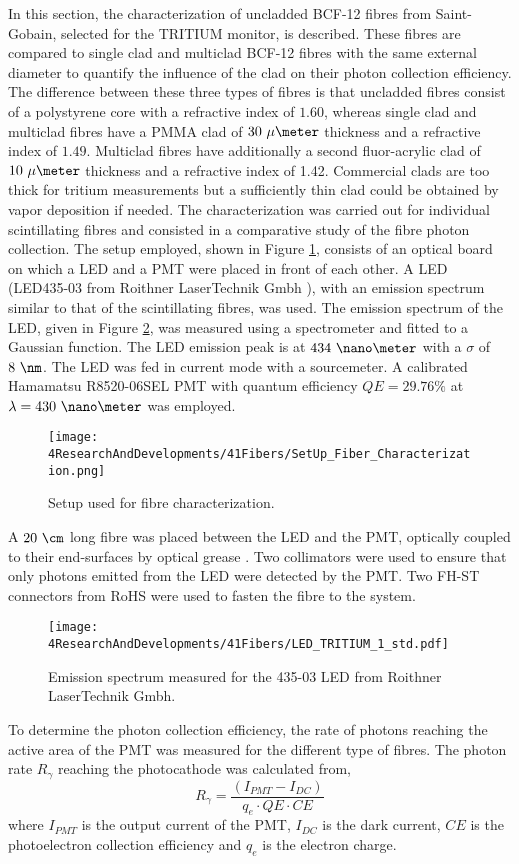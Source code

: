 In this section, the characterization of uncladded BCF-12 fibres from Saint-Gobain, selected for the TRITIUM monitor, is described. These fibres are compared to single clad and multiclad BCF-12 fibres with the same external diameter to quantify the influence of the clad on their photon collection efficiency. The difference between these three types of fibres is that uncladded fibres consist of a polystyrene core with a refractive index of $1.60$, whereas single clad and multiclad fibres have a PMMA clad of $30~\mu\meter$ thickness and a refractive index of $1.49$. Multiclad fibres have additionally a second fluor-acrylic clad of $10~\mu\meter$ thickness and a refractive index of 1.42. Commercial clads are too thick for tritium measurements but a sufficiently thin clad could be obtained by vapor deposition if needed. The characterization was carried out for individual scintillating fibres and consisted in a comparative study of the fibre photon collection. The setup employed, shown in Figure \ref{fig:SetUpFiberCharacterization}, consists of an optical board on which a LED and a PMT were placed in front of each other. A LED (LED435-03 from Roithner LaserTechnik Gmbh \cite{LEDRLT}), with an emission spectrum similar to that of the scintillating fibres, was used. The emission spectrum of the LED, given in Figure \ref{fig:LEDSpectrumTritium}, was measured using a spectrometer and fitted to a Gaussian function. The LED emission peak is at $434~\nano\meter$ with a $\sigma$ of $8~\nm$. The LED was fed in current mode with a sourcemeter. A calibrated Hamamatsu R8520-06SEL PMT with quantum efficiency $QE=29.76\%$ at $\lambda=430~\nano\meter$ was employed. 
\begin{figure}[h]
\centering
\texttt{[image: 4ResearchAndDevelopments/41Fibers/SetUp\_Fiber\_Characterization.png]}
\caption{Setup used for fibre characterization.\label{fig:SetUpFiberCharacterization}}
\end{figure}
A $20~\cm$ long fibre was placed between the LED and the PMT, optically coupled to their end-surfaces by optical grease \cite{OpticalGrease}. Two collimators were used to ensure that only photons emitted from the LED were detected by the PMT. Two FH-ST connectors from RoHS \cite{} were used to fasten the fibre to the system. 
\begin{figure}[h]
\centering
\texttt{[image: 4ResearchAndDevelopments/41Fibers/LED\_TRITIUM\_1\_std.pdf]}
\caption{Emission spectrum measured for the 435-03 LED from Roithner LaserTechnik Gmbh.\label{fig:LEDSpectrumTritium}}
\end{figure}
To determine the photon collection efficiency, the rate of photons reaching the active area of the PMT was measured for the different type of fibres. The photon rate $R_{\gamma}$ reaching the photocathode was calculated from,
\begin{equation}
R_{\gamma} = \frac{\left( I_{PMT} - I_{DC} \right)}{q_e \cdot{} QE \cdot{} CE}
\label{eq:NumPhotonsFromIntensityPMT}
\end{equation}
where $I_{PMT}$ is the output current of the PMT, $I_{DC}$ is the dark current, $CE$ is the photoelectron collection efficiency and $q_e$ is the electron charge.